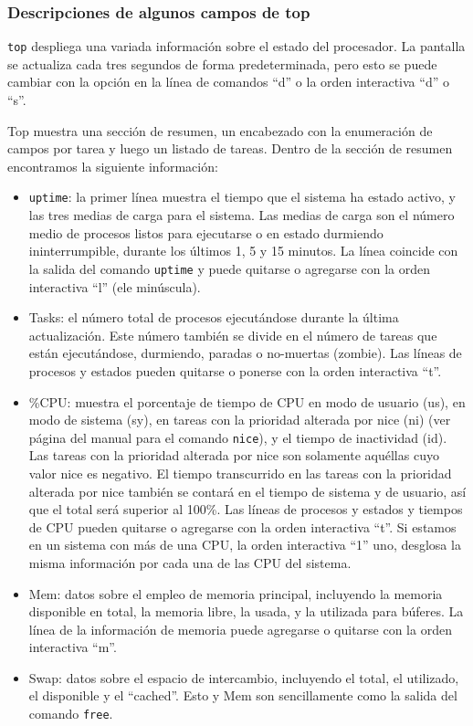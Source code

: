 \documentclass[12pt]{article}
\begin{document}
\subsubsection*{Descripciones de algunos campos de top}
\texttt{top} despliega  una variada información sobre el estado del 
procesador. La pantalla se actualiza cada tres segundos de forma 
predeterminada, pero esto se puede cambiar con la opción en la línea de 
comandos ``d'' o la orden interactiva ``d'' o ``s''.

Top muestra una sección de resumen, un encabezado con la enumeración de
campos por tarea y luego un listado de tareas. Dentro de la sección de
resumen encontramos la siguiente información:  

\begin{itemize}
\item \texttt{uptime}: la primer línea muestra el tiempo
 que el sistema ha  estado  activo,  y  las  tres medias de carga para el 
sistema. Las medias de carga son  el número medio de procesos listos  para
ejecutarse  o en estado durmiendo ininterrumpible, durante  los  últimos
1,  5  y  15  minutos.  La línea coincide con la salida del comando 
\texttt{uptime} y puede quitarse o agregarse con la orden interactiva 
``l'' (ele minúscula).
\item  Tasks: el  número  total  de  procesos ejecutándose durante  la  
última actualización. Este número también  se  divide  en  el  número 
de  tareas  que  están  ejecutándose, durmiendo, paradas o no-muertas 
(zombie).  Las líneas de procesos y estados pueden quitarse o ponerse con 
la orden interactiva ``t''.
\item  \%CPU: muestra el porcentaje de tiempo de CPU en modo de usuario 
(us), en modo  de sistema (sy), en tareas con la prioridad alterada por
 nice (ni) (ver página del manual para el comando \texttt{nice}), y el 
 tiempo  de  inactividad (id).  Las tareas con la prioridad alterada por 
nice son solamente aquéllas cuyo  valor  nice  es  negativo. El tiempo  
transcurrido  en  las tareas con la prioridad alterada por nice también 
se contará en el tiempo de sistema y de usuario,  así que  el  total  
será  superior  al  100\%. Las líneas de procesos y estados y tiempos
 de CPU pueden quitarse o agregarse  con  la  orden interactiva ``t''.
Si estamos en un sistema con más de una CPU, la orden interactiva ``1'' 
uno, desglosa la misma información por cada una de las CPU del sistema.
\item Mem: datos sobre el empleo de memoria principal, incluyendo la 
memoria disponible en total,  la  memoria  libre,  la  usada, y  la
utilizada  para  búferes.  La  línea  de la información de memoria puede 
agregarse o quitarse con la orden interactiva ``m''.
\item Swap: datos sobre el  espacio  de  intercambio,  incluyendo  el  
total,  el utilizado, el disponible  y  el ``cached''. Esto y Mem son 
sencillamente como la salida del comando \texttt{free}.
\end{itemize}
\end{document}
